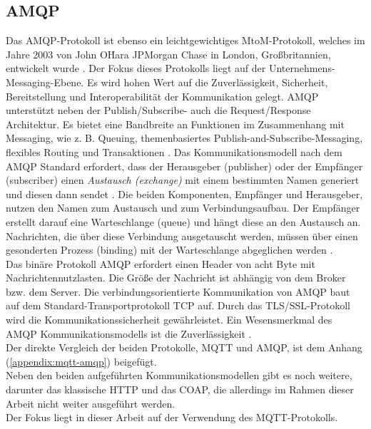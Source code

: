     \subsection{AMQP}
    \label{subsec:amqp}
        Das \ac{AMQP}-Protokoll ist ebenso ein leichtgewichtiges \acs{MtoM}-Protokoll, welches im Jahre 2003 von John O\'Hara JPMorgan Chase 
        in London, Großbritannien, entwickelt wurde \cite{Naik2017}. Der Fokus dieses Protokolls liegt auf der Unternehmens-Messaging-Ebene. 
        Es wird hohen Wert auf die Zuverlässigkeit, Sicherheit, Bereitstellung und Interoperabilität der Kommunikation gelegt. \acs{AMQP} 
        unterstützt neben der Publish/Subscribe- auch die Request/Response Architektur. Es bietet eine Bandbreite an 
        Funktionen im Zusammenhang mit Messaging, wie z. B. Queuing, themenbasiertes Publish-and-Subscribe-Messaging, 
        flexibles Routing und Transaktionen \cite{Naik2017}. Das Kommunikationsmodell nach dem \acs{AMQP} Standard erfordert, dass der 
        Herausgeber (publisher) oder der Empfänger (subscriber) einen \textit{Austausch (exchange)} mit einem bestimmten Namen generiert 
        und diesen dann sendet \cite{Naik2017}. Die beiden Komponenten, Empfänger und Herausgeber, nutzen den Namen zum Austausch und zum 
        Verbindungsaufbau. Der Empfänger erstellt darauf eine Warteschlange (queue) und hängt diese an den Austausch an. Nachrichten, die 
        über diese Verbindung ausgetauscht werden, müssen über einen gesonderten Prozess (binding) mit der Warteschlange abgeglichen werden 
        \cite{Naik2017}.
        \\ 
        Das binäre Protokoll \acs{AMQP} erfordert einen Header von acht Byte mit Nachrichtennutzlasten. Die Größe der Nachricht ist abhängig 
        von dem Broker bzw. dem Server. Die verbindungsorientierte Kommunikation von \acs{AMQP} baut auf dem Standard-Transportprotokoll 
        \acs{TCP} auf. Durch das \acs{TLS}/\acs{SSL}-Protokoll wird die Kommunikationssicherheit gewährleistet. Ein Wesensmerkmal des \acs{AMQP} 
        Kommunikationsmodells ist die Zuverlässigkeit \cite{Naik2017}. 
        \\
        \linebreak
        Der direkte Vergleich der beiden Protokolle, \acs{MQTT} und \acs{AMQP}, ist dem Anhang (\ref{appendix:mqtt-amqp}) beigefügt.
        \\
        \linebreak
        Neben den beiden aufgeführten Kommunikationsmodellen gibt es noch weitere, darunter das klassische \ac{HTTP} und das \ac{COAP}, die allerdings 
        im Rahmen dieser Arbeit nicht weiter ausgeführt werden. 
        \\
        \linebreak
        Der Fokus liegt in dieser Arbeit auf der Verwendung des \acs{MQTT}-Protokolls. 
